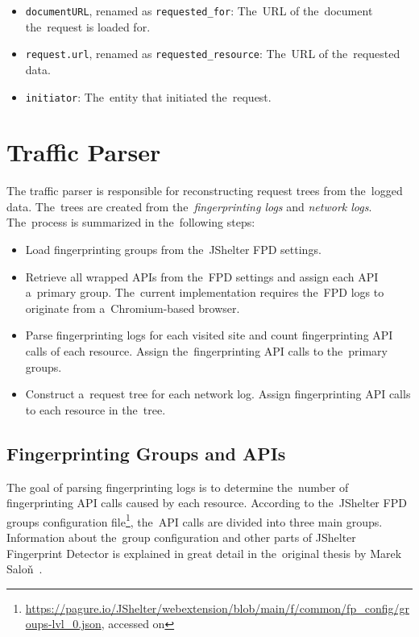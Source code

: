 \begin{itemize}
\setlength\itemsep{0em}
\item \texttt{documentURL}, renamed as \texttt{requested\_for}: The~URL of the~document the~request is loaded for.
\item \texttt{request.url}, renamed as \texttt{requested\_resource}: The~URL of the~requested data.
\item \texttt{initiator}: The~entity that initiated the~request.
\end{itemize}

\section{Traffic Parser}
The traffic parser is responsible for reconstructing request trees from the~logged data. The~trees are created from the~\textit{fingerprinting logs} and \textit{network logs}. The~process is summarized in the~following steps:

\begin{itemize}
\setlength\itemsep{0em}
\item Load fingerprinting groups from the~JShelter FPD settings.
\item Retrieve all wrapped APIs from the~FPD settings and assign each API a~primary group. The~current implementation requires the~FPD logs to originate from a~Chro\-mium-based browser.
\item Parse fingerprinting logs for each visited site and count fingerprinting API calls of each resource. Assign the~fingerprinting API calls to the~primary groups.
\item Construct a~request tree for each network log. Assign fingerprinting API calls to each resource in the~tree.
\end{itemize}

\subsection{Fingerprinting Groups and APIs}
\label{fp-groups-apis}
The goal of parsing fingerprinting logs is to determine the~number of fingerprinting API calls caused by each resource. According to the~JShelter FPD groups configuration file\footnote{\url{https://pagure.io/JShelter/webextension/blob/main/f/common/fp\_config/groups-lvl\_0.json}, accessed on }, the~API calls are divided into three main groups. Information about the~group configuration and other parts of JShelter Fingerprint Detector is explained in great detail in the~original thesis by Marek Saloň~\cite{salon-mit}.

